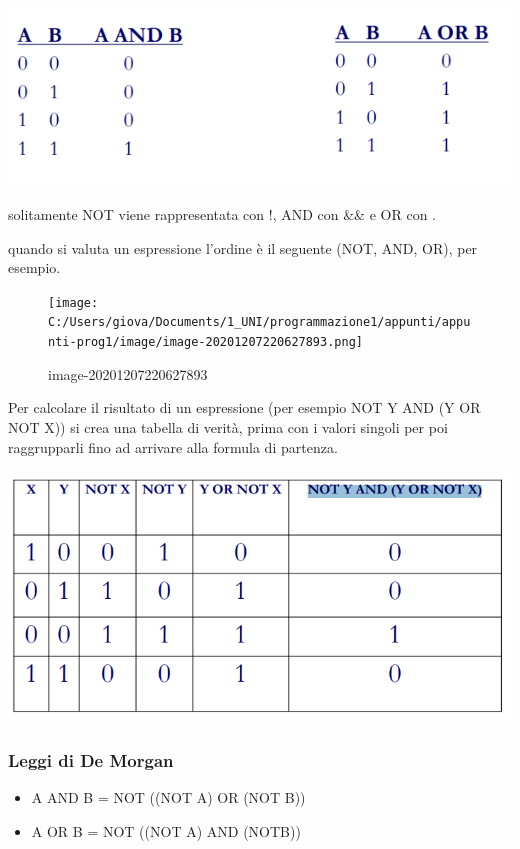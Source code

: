 \documentclass[
  paper=a4,
  oneside  ,captions=tableheading
]{scrbook}
\providecommand{\tightlist}{%
  \setlength{\itemsep}{0pt}\setlength{\parskip}{0pt}}
\begin{document}
\includegraphics{./image/image-20201207220252086-1607774220882.png}

solitamente NOT viene rappresentata con !, AND con \&\& e OR con
\textbar\textbar.

quando si valuta un espressione l'ordine è il seguente (NOT, AND, OR),
per esempio.

\begin{figure}
\centering
\texttt{[image: C:/Users/giova/Documents/1\_UNI/programmazione1/appunti/appunti-prog1/image/image-20201207220627893.png]}
\caption{image-20201207220627893}
\end{figure}

Per calcolare il risultato di un espressione (per esempio NOT Y AND (Y
OR NOT X)) si crea una tabella di verità, prima con i valori singoli per
poi raggrupparli fino ad arrivare alla formula di partenza.

\includegraphics{./image/image-20201207220834575.png}

\hypertarget{leggi-di-de-morgan}{%
\subsubsection{Leggi di De Morgan}\label{leggi-di-de-morgan}}

\begin{itemize}
\tightlist
\item
  A AND B = NOT ((NOT A) OR (NOT B))
\item
  A OR B = NOT ((NOT A) AND (NOTB))
\end{itemize}
\end{document}
